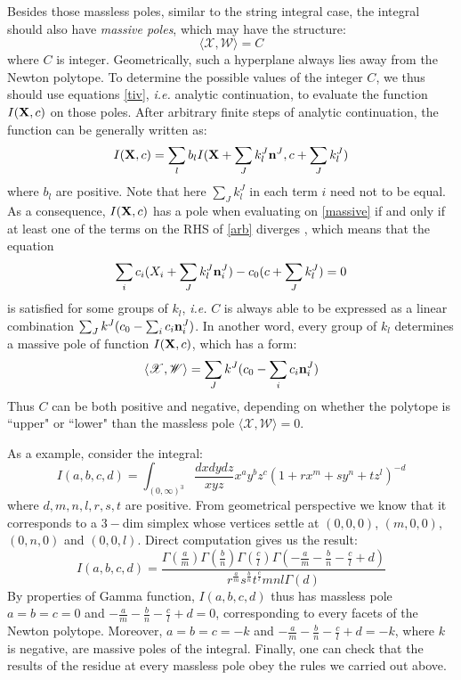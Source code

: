 \documentclass[12pt]{article}
\theoremstyle{definition}
\theoremstyle{plain}
\begin{document}
Besides those massless poles, similar to the string integral case, the integral should also have {\it massive poles}, which may have the structure:
\begin{equation}\label{massive}
{\langle {\mathscr X}, {\mathscr W}\rangle}=C
\end{equation}  
where $C$ is integer. Geometrically, such a hyperplane always lies away from the Newton polytope.  To determine the possible values of the integer $C$, we thus should use equations \eqref{tiv}, {\it i.e.} analytic continuation, to evaluate the function  $I({\bf X},c)$  on those poles. After arbitrary finite steps of analytic continuation, the function can be generally written as:
\begin{equation}\label{arb}
 I({\bf X},c)=\sum_{l} b_{l} I({\bf X}+\sum_J k_l^J {\bf n}^J,c+\sum_J k_l^J)
\end{equation}   
where $b_l$ are positive. Note that here $\sum_J k_l^J$ in each term $i$ need not to be equal. As a consequence, $I({\bf X},c)$ has a pole when evaluating on \eqref{massive} if and only if at least one of the terms on the RHS of \eqref{arb} diverges , which means that the equation
\begin{equation}
\sum_i c_i (X_i+\sum_J k_l^J {\bf n}_i^J)-c_0(c+\sum_J k_l^J)=0
\end{equation}
is satisfied for some groups of $k_l$, {\it i.e.} $C$ is always able to be  expressed as a linear combination $\sum_J k^J (c_0-\sum_i c_i{\bf n}_i^J)$. In another word, every group of $k_l$  determines a massive pole of function $I({\bf X},c)$, which has a form:
\begin{equation}
{\langle {\mathscr X}, {\mathscr W}\rangle}=\sum_J k^J (c_0-\sum_i c_i{\bf n}_i^J)
\end{equation}
Thus $C$ can be both positive and negative, depending on whether the polytope is ``upper" or ``lower" than the massless pole ${\langle {\mathscr X}, {\mathscr W}\rangle}=0$.

As a example, consider the integral:
\begin{equation}
I(a,b,c,d)=\int_{(0,\infty)^3}\frac{dxdydz}{xyz}x^ay^bz^c(1+r x^m+s y^n+t z^l)^{-d}
\end{equation}
where $d,m,n,l,r,s,t$ are positive. From geometrical perspective we know that it corresponds to a $3-$dim simplex whose vertices settle at $(0,0,0)$, $(m,0,0)$, $(0,n,0)$ and $(0,0,l)$. Direct computation gives us the result:
\begin{equation}
I(a,b,c,d)=\frac{\Gamma(\frac am)\Gamma(\frac bn)\Gamma(\frac cl)\Gamma(-\frac am-\frac bn-\frac cl+d)}{r^{\frac am}s^{\frac bn }t^{\frac cl}mnl\Gamma(d)}
\end{equation}
By properties of Gamma function, $I(a,b,c,d)$ thus has massless pole $a=b=c=0$ and $-\frac am-\frac bn-\frac cl+d=0$, corresponding to every facets of the Newton polytope. Moreover, $a=b=c=-k$ and $-\frac am-\frac bn-\frac cl+d=-k$, where $k$ is negative, are massive poles of the integral. Finally, one can check that the results of the residue at every massless pole obey the rules we carried out above.
\end{document}
